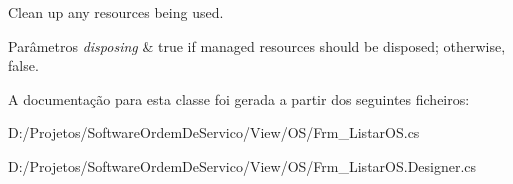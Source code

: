 Clean up any resources being used. 


\begin{DoxyParams}{Parâmetros}
{\em disposing} & true if managed resources should be disposed; otherwise, false.\\
\hline
\end{DoxyParams}


A documentação para esta classe foi gerada a partir dos seguintes ficheiros\+:\begin{DoxyCompactItemize}
\item 
D\+:/\+Projetos/\+Software\+Ordem\+De\+Servico/\+View/\+O\+S/Frm\+\_\+\+Listar\+O\+S.\+cs\item 
D\+:/\+Projetos/\+Software\+Ordem\+De\+Servico/\+View/\+O\+S/Frm\+\_\+\+Listar\+O\+S.\+Designer.\+cs\end{DoxyCompactItemize}
